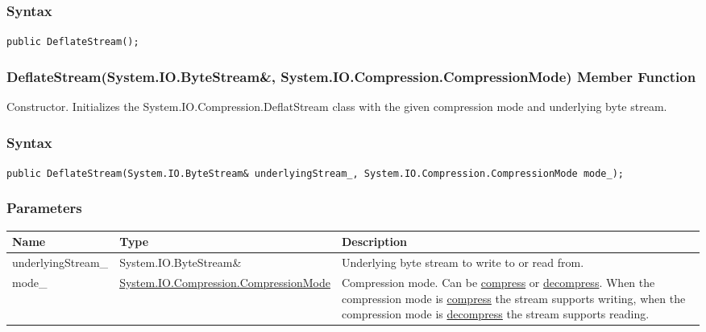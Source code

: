\documentclass[a4paper,oneside,11.000000pt]{book}
\begin{document}
\subsubsection*{Syntax}
\texttt{public DeflateStream();}
\clearpage

\hypertarget{System.IO.Compression.DeflateStream.constructor.P.System.IO.Compression.DeflateStream.R.System.IO.ByteStream.System.IO.Compression.CompressionMode}{\subsubsection*{DeflateStream(System.IO.ByteStream\&, System.IO.Compression.CompressionMode) Member Function}}
\begin{flushleft}
Constructor. Initializes the System.\-IO.\-Compression.\-DeflatStream class with the given compression mode and underlying byte stream.

\end{flushleft}
\subsubsection*{Syntax}
\texttt{public DeflateStream(System.IO.ByteStream\& underlyingStream\_, System.IO.Compression.CompressionMode mode\_);}
\subsubsection*{Parameters}
\begin{flushleft}
\begin{supertabular}[l]{!{\raggedright}p{4.10323cm}!{\raggedright}p{5.76344cm}!{\raggedright}p{4.93333cm}}
\textbf{Name}
& \textbf{Type}
& \textbf{Description}
\\
\hline
underlyingStream\_
& System.\-IO.\-ByteStream\&\-
& Underlying byte stream to write to or read from.

\\
mode\_
& \hyperlink{System.IO.Compression.CompressionMode}{System.\-IO.\-Compression.\-CompressionMode}
& Compression mode. Can be \hyperlink{System.IO.Compression.CompressionMode.compress}{compress} or \hyperlink{System.IO.Compression.CompressionMode.decompress}{decompress}.
When the compression mode is \hyperlink{System.IO.Compression.CompressionMode.compress}{compress} the stream supports writing,
when the compression mode is \hyperlink{System.IO.Compression.CompressionMode.decompress}{decompress} the stream supports reading.

\\
\end{supertabular}

\end{flushleft}
\end{document}
